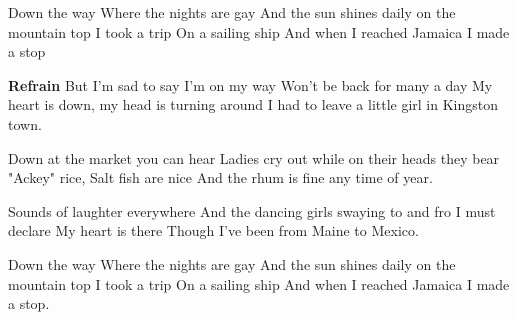 \footnotemark [
ititle={Jamaica farewell}]


\beginverse
Down the way
Where the nights are gay
And the sun shines daily on the mountain top
I took a trip
On a sailing ship
And when I reached Jamaica I made a stop
\endverse

\beginchorus
\textbf{Refrain}
But I'm sad to say I'm on my way
Won't be back for many a day
My heart is down, my head is turning around
I had to leave a little girl in Kingston town.
\endchorus

\beginverse
Down at the market you can hear
Ladies cry out while on their heads they bear
"Ackey" rice,
Salt fish are nice
And the rhum is fine any time of year.
\endverse

\beginverse
Sounds of laughter everywhere
And the dancing girls swaying to and fro
I must declare
My heart is there
Though I've been from Maine to Mexico.
\endverse

\beginverse
Down the way
Where the nights are gay
And the sun shines daily on the mountain top
I took a trip
On a sailing ship
And when I reached Jamaica I made a stop.
\endverse
\endsong